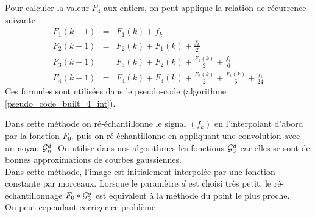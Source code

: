 Pour calculer la valeur $F_4$ aux entiers, on peut applique la relation de récurrence suivante
\begin{eqnarray*}
F_{1}(k+1)&=&  F_{1}(k)+f_{k}  \\
F_{2}(k+1)&=&  F_{2}(k)+F_{1}(k)+\frac{f_{k}}{2}   \\
F_{3}(k+1)&=&  F_{3}(k)+F_{2}(k)+\frac{F_{1}(k)}{2}+\frac{f_{k}}{6}   \\
F_{4}(k+1)&=&  F_{4}(k)+F_{3}(k)+\frac{F_{2}(k)}{2}+\frac{F_{1}(k)}{6}+\frac{f_{k}}{24}  
\end{eqnarray*}
Ces formules sont utilisées dans le pseudo-code (algorithme \ref{pseudo_code_built_4_int}).

Dans cette méthode on ré-échantillonne le signal $(f_k)$ en l'interpolant d'abord par la fonction $F_{0}$, puis on ré-échantillonne en appliquant une convolution avec un noyau $\mathcal{G}_n^d$. On utilise dans nos algorithmes les fonctions $\mathcal{G}_3^d$ car elles se sont de bonnes approximations de courbes gaussiennes.\\ %
Dans cette méthode, l'image est initialement interpolée par une fonction constante par morceaux. Lorsque le paramètre $d$ est choisi très petit, le ré-échantillonnage $F_{0}*\mathcal{G}_3^d$ est équivalent à la méthode du point le plus proche.\\
On peut cependant corriger ce problème

